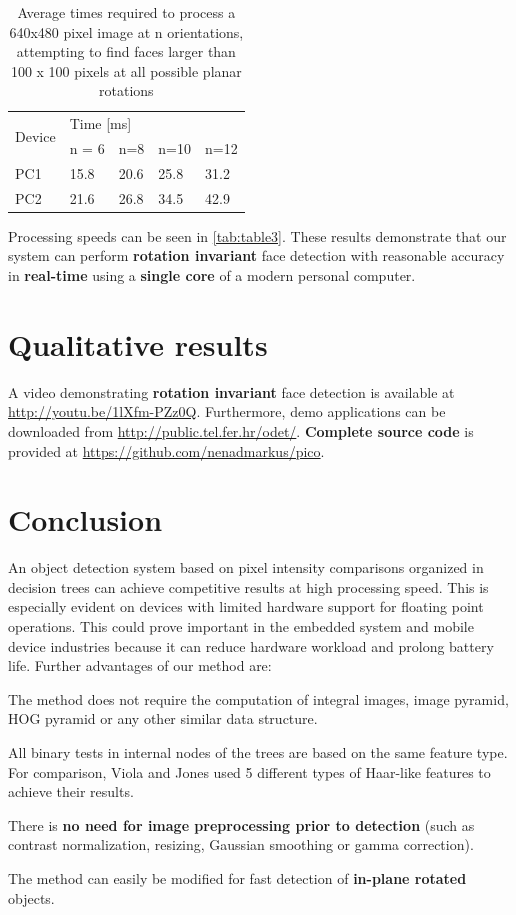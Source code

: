 \documentclass[a4paper,12pt]{article}
\begin{document}
\begin{table}[hb]
\begin{tabular}{|l|l|l|l|l|}
\hline
\multirow{2}{*}{Device} & \multicolumn{4}{l|}{Time {[}ms{]}} \\ \cline{2-5} 
                        & n = 6   & n=8    & n=10   & n=12   \\ \hline
PC1                     & 15.8    & 20.6   & 25.8   & 31.2   \\ \hline
PC2                     & 21.6    & 26.8   & 34.5   & 42.9   \\ \hline
\end{tabular}
\caption{Average times required to process a 640x480 pixel image at n orientations, attempting to find faces larger than 100 x 100 pixels at all possible planar rotations}
\label{tab:table3}
\end{table}

Processing speeds can be seen in \autoref{tab:table3}. These results demonstrate
that our system can perform \textbf{rotation invariant} face detection
with reasonable accuracy in \textbf{real-time} using a \textbf{single core} of a modern personal computer.

\section{Qualitative results}
A video demonstrating \textbf{rotation invariant} face detection is available at 
\url{http://youtu.be/1lXfm-PZz0Q}.
Furthermore, demo applications can be downloaded from \url{http://public.tel.fer.hr/odet/}. 
\textbf{Complete source code} is provided at \url{https://github.com/nenadmarkus/pico}.

\section{Conclusion}
An object detection system based on pixel intensity comparisons organized in decision trees 
can achieve competitive results at high processing speed. This is especially evident on devices with limited hardware support for floating point operations. This could prove important in the embedded system and mobile device industries because it can reduce hardware workload and prolong battery life.
Further advantages of our method are:
\begin{compactitem}
\item The method does not require the computation of integral
images, image pyramid, HOG pyramid or any other
similar data structure.
\item All binary tests in internal nodes of the trees are based on
the same feature type. For comparison, Viola and Jones
used 5 different types of Haar-like features to achieve
their results.
\item There is \textbf{no need for image preprocessing prior to detection} (such as contrast normalization, resizing, Gaussian smoothing or gamma correction).
\item The method can easily be modified for fast detection of \textbf{in-plane rotated} objects.
\end{compactitem}
\end{document}
